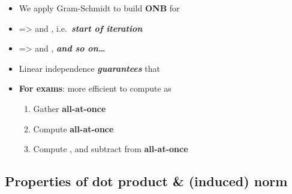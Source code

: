 \begin{itemize}
\begin{itemize}
          \item
                We apply Gram-Schmidt to build \textbf{ONB}
                for 
          \item
                 =\textgreater{}
                 and
                ,
                i.e.~\textbf{\emph{start of iteration}}
          \item
                 =\textgreater{}
                and ,
                \textbf{\emph{and so on\ldots{}}}
          \item
                Linear independence \textbf{\emph{guarantees}} that
          \item
                \textbf{For exams}: more efficient to compute as

                \begin{enumerate}
                  \def\labelenumi{\arabic{enumi})}

                  \item
                        Gather
                        \textbf{all-at-once}
                  \item
                        Compute
                        \textbf{all-at-once}
                  \item
                        Compute , and
                        subtract from  \textbf{all-at-once}
                \end{enumerate}
        \end{itemize}
\end{itemize}

\subsection*{Properties of dot product \& (induced)
  norm}

